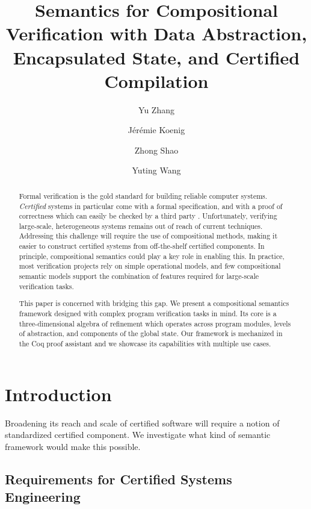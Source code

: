 \documentclass[acmsmall,screen,review,anonymous]{acmart}
\title{Semantics for Compositional Verification with
  Data Abstraction, Encapsulated State, and Certified Compilation}
\author{Yu Zhang}
\affiliation{
  \institution{Yale University}
  \city{New Haven}
  \state{CT}
  \country{USA}}
\author{J\'er\'emie Koenig}
\affiliation{
  \institution{Yale University}
  \city{New Haven}
  \state{CT}
  \country{USA}}
\author{Zhong Shao}
\affiliation{
  \institution{Yale University}
  \city{New Haven}
  \state{CT}
  \country{USA}}
\author{Yuting Wang}
\affiliation{
  \institution{Shanghai Jiao Tong University}
  \city{Shanghai}
  \country{China}}
\begin{document}
\newtheorem{remark}[theorem]{Remark}

\begin{abstract} %
Formal verification is the gold standard
for building reliable computer systems.
\emph{Certified} systems in particular
come with a formal specification,
and with a proof of correctness
which can easily be checked by a third party%
. %
Unfortunately, verifying large-scale, heterogeneous systems
remains out of reach of current techniques.
Addressing this challenge
will require the use of compositional methods,
making it easier to construct certified systems
from off-the-shelf certified components.
%
In principle,
compositional semantics
could play a key role in enabling this.
In practice,
most verification projects rely on
simple %
operational models,
and few compositional semantic models
support the combination of features
required for large-scale verification tasks.

This paper is concerned with bridging this gap.
We present a compositional semantics framework
designed with complex program verification tasks in mind.
Its core is a three-dimensional algebra of refinement
which operates across program modules,
levels of abstraction, and
components of the global state.
Our framework is mechanized in the Coq proof assistant
and we showcase its capabilities with multiple use cases.
\end{abstract}


\maketitle

\section{Introduction} \label{sec:intro} %

Broadening its reach and scale
of certified software \cite{shao10}
will require a notion of standardized certified component.
We investigate what kind of
semantic framework would make this possible.


\subsection{Requirements for Certified Systems Engineering} \label{sec:req} %
\end{document}
